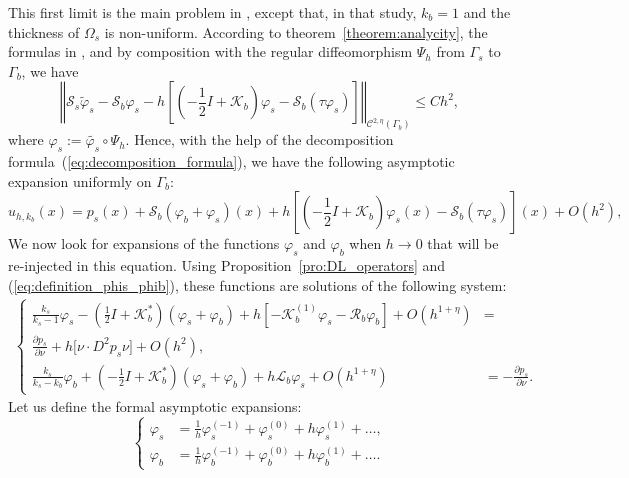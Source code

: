 This first limit is the main problem in \cite[chapter
3]{zribilayer}, except that, in that study, $k_{b}=1$ and the
thickness of $\Omega_{s}$ is non-uniform. According to
theorem~\ref{theorem:analycity}, the formulas in
\cite{crisoforis2004}, and by composition with the regular
diffeomorphism $\Psi_{h}$ from $\Gamma_{s}$ to $\Gamma_{b}$,
we have
\[
\left\Vert
\mathcal{S}_{s}\tilde{\varphi}_{s}-\mathcal{S}_{b}\varphi_{s}-h\left[\left(-\frac{1}{2}I+\mathcal{K}_{b}\right)\varphi_{s}-\mathcal{S}_{b}(\tau\varphi_{s})\right]
\right\Vert _{\mathcal{C}^{2,\eta}(\Gamma_{b})}\leq Ch^{2},
\]
 where $\varphi_{s}:=\tilde{\varphi_{s}}\circ\Psi_{h}$. Hence,
with the help of the decomposition formula~(\ref{eq:decomposition_formula}),
we have the following asymptotic expansion uniformly on $\Gamma_{b}$:
\begin{equation}
u_{h,k_{b}}(x)=p_s(x)+\mathcal{S}_{b}(\varphi_{b}+\varphi_{s})(x)+h\left[\left(-\frac{1}{2}I+\mathcal{K}_{b}\right)\varphi_{s}(x)-\mathcal{S}_{b}(\tau\varphi_{s})\right](x)+O(h^{2}),\label{eq:DL_u}
\end{equation}
 We now look for expansions of the functions $\varphi_{s}$
and $\varphi_{b}$ when $h\rightarrow0$ that will be re-injected
in this equation. Using Proposition~\ref{pro:DL_operators} and (\ref{eq:definition_phis_phib}),
these functions are solutions of the following system:
\begin{multline}
\left\{ \begin{alignedat}{1}\frac{k_{s}}{k_{s}-1}\varphi_{s}-\left(\frac{1}{2}I+\mathcal{K}_{b}^{*}\right)(\varphi_{s}+\varphi_{b})+h\left[-\mathcal{K}_{b}^{(1)}\varphi_{s}-\mathcal{R}_{b}\varphi_{b}\right]+O(h^{1+\eta}) & =\\
\frac{\partial p_s}{\partial\nu}+h \big[\nu \cdot D^{2}p_s\nu \big]  +O(h^{2}),\\
\frac{k_{s}}{k_{s}-k_{b}}\varphi_{b}+\left(-\frac{1}{2}I+\mathcal{K}_{b}^{*}\right)(\varphi_{s}+\varphi_{b})
+h\mathcal{L}_{b}\varphi_{s}+O(h^{1+\eta}) &
=-\frac{\partial p_s}{\partial\nu}.
\end{alignedat}
\right.\label{eq:modified_system}
\end{multline}
 Let us define the formal asymptotic expansions:
\[
\left\{ \begin{alignedat}{1}\varphi_{s} & =\frac{1}{h}\varphi_{s}^{(-1)}+\varphi_{s}^{(0)}+h\varphi_{s}^{(1)}+\ldots,\\
\varphi_{b} & =\frac{1}{h}\varphi_{b}^{(-1)}+\varphi_{b}^{(0)}+h\varphi_{b}^{(1)}+\ldots.
\end{alignedat}
\right.
\]
